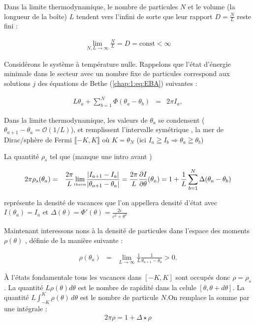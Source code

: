 Dans la limite thermodynamique, le nombre de particules \( N \) et le volume 
(la longueur de la boîte) \( L \) tendent vers l'infini de sorte que leur rapport 
\( D = \frac{N}{L} \) reste fini :

\begin{eqnarray*}
	\lim_{N, L \to \infty} \frac{N}{L} = D = \mbox{const} < \infty	
\end{eqnarray*}

Considérons le système à température nulle. Rappelons que l'état 
d'énergie minimale dans le secteur avec un nombre fixe de particules 
correspond aux solutions \( j \) des équations de Bethe (\eqref{chap:1:eq:EBA}) suivantes :

\begin{eqnarray*}
	L \theta_a + \sum_{b = 1}^N \Phi ( \theta_a - \theta_b ) & = & 2\pi I_a ,	
\end{eqnarray*}

Dans la limite thermodynamique, les valeurs de \( \theta_a \) se condensent (\(\theta_{a+1} - \theta_a = \mathcal{O}(1/L)\)), et remplissent l'intervalle symétrique , la mer de Dirac/sphère de Fermi  \(\llbracket-K, K\rrbracket\) où $K = \theta_N$ (ici $I_a \geqq I_b \Rightarrow \theta_a \geqq \theta_b$)

La quantité $\rho_s$ tel que (manque une intro avant ) 

\begin{eqnarray*}
	2\pi \rho_s (\theta_a) & = & \frac{2\pi}{L}\underset{\tiny \mbox{therm}}{\lim} \frac{ \vert I_{a+1} - I_{a} \vert}{ \vert \theta_{a+1} - \theta_a \vert} = \frac{2\pi}{L} \frac{ \partial I}{\partial \theta } ( \theta_a ) = 1 	+ \frac{1}{L}\sum_{b = 1}^N \Delta (\theta_a - \theta_b)
\end{eqnarray*}

représente la densité de vacances que l'on appellera densité d'état avec $I(\theta_a) = I_a$ et  $\Delta(\theta) = \Phi'(\theta)  = \frac{2c}{c^2 + \theta^2}$

Maintenant interessons nons à la densité de particules dans l'espace des moments \( \rho(\theta) \) , définie de la manière suivante :

\begin{eqnarray*}
	\rho(\theta_a)  &=  &\lim_{L \to \infty} \frac{1}{L} \frac{1}{\theta_{a+1} - \theta_a} > 0.	
\end{eqnarray*}

À l'états fondamentale tous les vacances dans $[-K , K ]$  sont occupés donc $\rho = \rho_s$. La quantité $L\rho(\theta)d\theta$ est le nombre de rapidité dans la celule $[ \theta , \theta + d \theta ] $. La quantité $L \int_{-K}^K \rho (\theta ) \, d\theta $ est le nombre de particule $N$.On remplace la somme par une intégrale :
\begin{eqnarray*}
	2\pi \rho  = 1 + \Delta \star \rho 	
\end{eqnarray*}